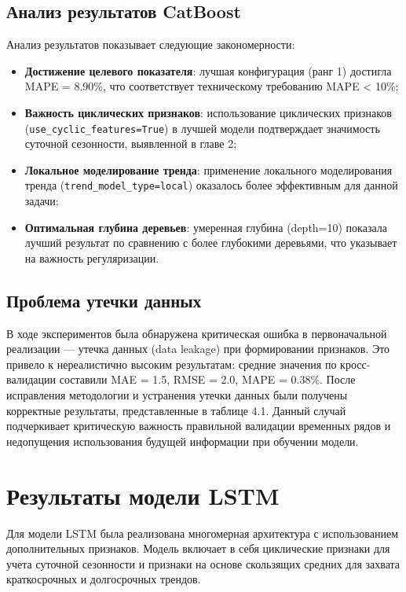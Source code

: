 \subsection{Анализ результатов CatBoost}

Анализ результатов показывает следующие закономерности:

\begin{itemize}
	\item \textbf{Достижение целевого показателя}: лучшая конфигурация (ранг 1) достигла MAPE = 8.90\%, что соответствует техническому требованию MAPE < 10\%;
	\item \textbf{Важность циклических признаков}: использование циклических признаков (\texttt{use\_cyclic\_features=True}) в лучшей модели подтверждает значимость суточной сезонности, выявленной в главе 2;
	\item \textbf{Локальное моделирование тренда}: применение локального моделирования тренда (\texttt{trend\_model\_type=local}) оказалось более эффективным для данной задачи;
	\item \textbf{Оптимальная глубина деревьев}: умеренная глубина (depth=10) показала лучший результат по сравнению с более глубокими деревьями, что указывает на важность регуляризации.
\end{itemize}

\subsection{Проблема утечки данных}

В ходе экспериментов была обнаружена критическая ошибка в первоначальной реализации --- утечка данных (data leakage) при формировании признаков. Это привело к нереалистично высоким результатам: средние значения по кросс-валидации составили MAE = 1.5, RMSE = 2.0, MAPE = 0.38\%. После исправления методологии и устранения утечки данных были получены корректные результаты, представленные в таблице 4.1. Данный случай подчеркивает критическую важность правильной валидации временных рядов и недопущения использования будущей информации при обучении модели.

\section{Результаты модели LSTM}
\label{sec:lstm_results}

Для модели LSTM была реализована многомерная архитектура с использованием дополнительных признаков. Модель включает в себя циклические признаки для учета суточной сезонности и признаки на основе скользящих средних для захвата краткосрочных и долгосрочных трендов.

